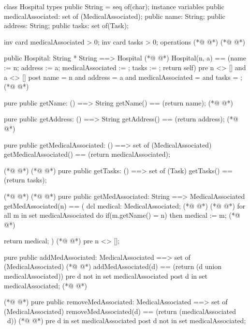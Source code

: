 \begin{vdmpp}[breaklines=true]
class Hospital
types
 public String = seq of(char);
instance variables
  public medicalAssociated: set of (MedicalAssociated);
  public name: String;
  public address: String;
  public tasks: set of(Task);
 
 inv card medicalAssociated > 0;
 inv card tasks > 0;
operations
(*@
\label{Hospital:13}
@*)
(*@
\label{Date:13}
@*)

 public Hospital: String * String ==> Hospital
(*@
\label{getName:15}
@*)
  Hospital(n, a) == (name := n; address := a; medicalAssociated := {}; tasks := {}; return self)
 pre n <> [] and a <> []
 post name = n and address = a and medicalAssociated = {} and tasks = {};
(*@
\label{getAddress:18}
@*)
 
 pure public getName: () ==> String
  getName() == (return name);
(*@
\label{getMedicalAssociated:21}
@*)
 
 pure public getAddress: () ==> String
  getAddress() == (return address);
(*@
\label{getMedAssociated:24}
@*)
  
 pure public getMedicalAssociated: () ==> set of (MedicalAssociated)
  getMedicalAssociated() == (return medicalAssociated);
  
(*@
\label{getTaks:28}
@*)
(*@
\label{getTasks:28}
@*)
 pure public getTasks: () ==> set of (Task)
  getTasks() == (return tasks);
 
(*@
\label{addMedAssociated:31}
@*)
(*@
\label{addDoctor:31}
@*)
 pure public getMedAssociated: String ==> MedicalAssociated
  getMedAssociated(n) == (
                   dcl medical: MedicalAssociated;
(*@
\label{addSurgeon:34}
@*)
(*@
\label{removeMedAssociated:34}
@*)
                   for all m in set medicalAssociated do
                    if(m.getName() = n)
                     then medical := m;
(*@
\label{addNurse:37}
@*)
                     
                   return medical;
                 )
(*@
\label{addTechnician:40}
@*)
 pre n <> [];
 
 pure public addMedAssociated: MedicalAssociated ==> set of (MedicalAssociated)
(*@
\label{removeDoctor:43}
@*)
  addMedAssociated(d) == (return ({d} union medicalAssociated))
 pre d not in set medicalAssociated
 post d in set medicalAssociated;
(*@
\label{removeSurgeon:46}
@*)
  
(*@
\label{numAppointments:47}
@*)
 pure public removeMedAssociated: MedicalAssociated ==> set of (MedicalAssociated)
  removeMedAssociated(d) == (return (medicalAssociated \ {d}))
(*@
\label{removeNurse:49}
@*)
 pre d in set medicalAssociated
 post d not in set medicalAssociated;
 

\end{vdmpp}
